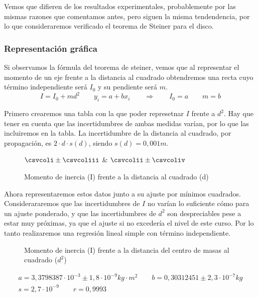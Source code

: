 \documentclass[12pt, a4paper, titlepage]{article}
\begin{document}
  Vemos que difieren de los resultados experimentales, probablemente por las mismas razones que comentamos antes, pero siguen la misma tendendencia, por lo que consideraremos verificado el teorema de Steiner para el disco.

  \subsubsection{Representación gráfica}

  Si observamos la fórmula del teorema de steiner, vemos que al representar el momento de un eje frente a la distancia al cuadrado obtendremos una recta cuyo término independiente será $I_0$ y su pendiente será $m$.
  \begin{equation*}
    I = I_0 + md^2 \qquad y_i = a + bx_i \qquad \Rightarrow \qquad
    I_0 = a \qquad m = b
  \end{equation*}

  Primero crearemos una tabla con la que poder represetnar $I$ frente a $d^2$. Hay que tener en cuenta que las incertidumbres de ambas medidas varían, por lo que las incluiremos en la tabla. La incertidumbre de la distancia al cuadrado, por propagación, es $2 \cdot d \cdot s(d)$, siendo $s(d) = 0,001m$.

  \begin{figure}[H]
    \begin{table}[H]
      \centering
        {}
        {$\csvcoli \pm \csvcoliii$ & $\csvcolii \pm \csvcoliv$}
    \end{table}
    \caption{Momento de inercia (I) frente a la distancia al cuadrado (d)}
  \end{figure}

  Ahora representaremos estos datos junto a su ajuste por mínimos cuadrados. Considerararemos que las incertidumbres de $I$ no varían lo suficiente cómo para un ajuste ponderado, y que las incertidumbres de $d^2$ son despreciables pese a estar muy próximas, ya que el ajuste si no excedería el nivel de este curso. Por lo tanto realizaremos una regresión lineal simple con término independiente.

  \begin{figure}[H]
    \hspace{3.2em} 
    \caption{Momento de inercia (I) frente a la distancia del centro de masas al cuadrado ($d^2$)}
  \end{figure}
  \begin{gather*}
    a = 3,3798387 \cdot 10^{-3} \pm 1,8 \cdot 10^{-9} kg \cdot m^2 \qquad b = 0,30312451 \pm 2,3 \cdot 10^{-7} kg \\
    s = 2,7 \cdot 10^{-9} \qquad r = 0,9993
  \end{gather*}
\end{document}
